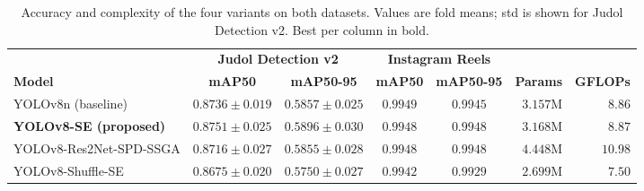 \begin{table}[t]
\caption{Accuracy and complexity of the four variants on both datasets. Values are fold means; std is shown for Judol Detection v2. Best per column in bold.}
\label{tab:main}
\centering
\footnotesize
\renewcommand{\arraystretch}{1.2}
\begin{tabular}{@{}lccccrr@{}}
\toprule
& \multicolumn{2}{c}{\textbf{Judol Detection v2}} & \multicolumn{2}{c}{\textbf{Instagram Reels}} & & \\
\cmidrule(lr){2-3}\cmidrule(lr){4-5}
\textbf{Model} & \textbf{mAP50} & \textbf{mAP50-95} & \textbf{mAP50} & \textbf{mAP50-95} & \textbf{Params} & \textbf{GFLOPs} \\
\midrule
YOLOv8n (baseline)          & $0.8736 \pm 0.019$ & $0.5857 \pm 0.025$ & $\mathbf{0.9949}$ & $0.9945$ & $3.157$M & $8.86$ \\
\textbf{YOLOv8-SE (proposed)} & $\mathbf{0.8751} \pm 0.025$ & $\mathbf{0.5896} \pm 0.030$ & $0.9948$ & $\mathbf{0.9948}$ & $3.168$M & $8.87$ \\
YOLOv8-Res2Net-SPD-SSGA     & $0.8716 \pm 0.027$ & $0.5855 \pm 0.028$ & $0.9948$ & $0.9948$ & $4.448$M & $10.98$ \\
YOLOv8-Shuffle-SE           & $0.8675 \pm 0.020$ & $0.5750 \pm 0.027$ & $0.9942$ & $0.9929$ & $\mathbf{2.699}$M & $\mathbf{7.50}$ \\
\bottomrule
\end{tabular}
\end{table}
